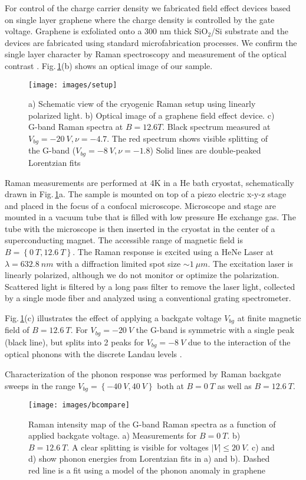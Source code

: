 \documentclass[prl,aps,superscriptaddress,showpacs,reprint]{revtex4-1}
\begin{document}
For control of the charge carrier density we fabricated field effect devices based on single layer graphene where the charge density is controlled by the gate voltage. Graphene is exfoliated onto a 300 nm thick SiO$_2$/Si substrate and the devices are fabricated using standard microfabrication processes. We confirm the single layer character by Raman spectroscopy and measurement of the optical contrast \cite{ferrari2006raman,casiraghi2007rayleigh,ni2007graphene,blake2007making}.
Fig.\,\ref{setup}(b) shows an optical image of our sample.

\begin{figure}
\texttt{[image: images/setup]}
\caption{\label{setup}a) Schematic view of the cryogenic Raman setup using linearly polarized light. b) Optical image of a graphene field effect device. c) G-band Raman spectra at $B=12.6T$. Black spectrum measured at $V_{bg}=-20\: V, \nu=-4.7$. The red spectrum shows visible splitting of the G-band ($V_{bg}=-8\: V,\nu=-1.8$) Solid lines are double-peaked Lorentzian fits}
\end{figure}

Raman measurements are performed at 4K in a He bath cryostat, schematically drawn in Fig.\,\ref{setup}a. The sample is mounted on top of a piezo electric x-y-z stage and placed in the focus of a confocal microscope. Microscope and stage are mounted in a vacuum tube that is filled with low pressure He exchange gas. The tube with the microscope is then inserted in the cryostat in the center of a superconducting magnet. The accessible range of magnetic field is $B=\left\lbrace 0\: T,12.6\: T \right\rbrace$.
The Raman response is excited using a HeNe Laser at $\lambda=632.8\: nm$ with a diffraction limited spot size $\sim 1\: \mu m$. The excitation laser is linearly polarized, although we do not monitor or optimize the polarization. Scattered light is filtered by a long pass filter to remove the laser light, collected by a single mode fiber and analyzed using a conventional grating spectrometer.

Fig.\,\ref{setup}(c) illustrates the effect of applying a backgate voltage $V_{bg}$ at finite magnetic field of $B=12.6\: T$. For $V_{bg}=-20\: V$ the G-band is symmetric with a single peak (black line), but splits into 2 peaks for $V_{bg}=-8\: V$ due to the interaction of the optical phonons with the discrete Landau levels \cite{kias2009} .

Characterization of the phonon response was performed by Raman backgate sweeps in the range $V_{bg}=\left\lbrace -40\: V,40\: V \right\rbrace$ both at $B=0\: T$ as well as $B=12.6\: T$.
\begin{figure}[!hb]
\texttt{[image: images/bcompare]}
\caption{\label{bcompare}
Raman intensity map of the G-band Raman spectra as a function of applied backgate voltage. a) Measurements for $B=0\: T$. b) $B=12.6\: T$. A clear splitting is visible for voltages $\left|V\right|\leq 20\: V$. c) and d)  show phonon energies from Lorentzian fits in a) and b). Dashed red line is a fit using a model of the phonon anomaly in graphene \cite{tsuneya2006anomaly}}
\end{figure}
\end{document}
